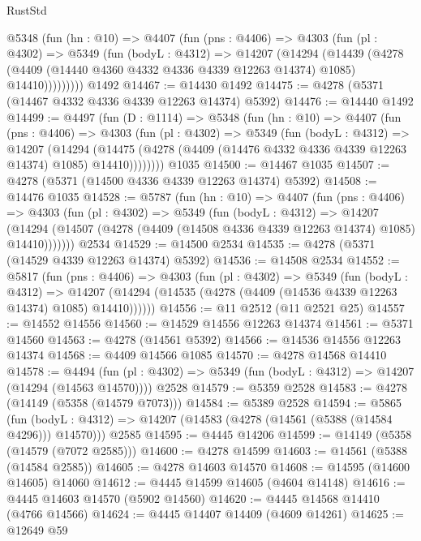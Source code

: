 \begin{lexlean}{RustStd}
\begin{coremodule}
{\begin{coremodule}
{{{{{{{{{{{{{{{{{{{{{{{{{{{{{{{{{{{      @5348
        (fun (hn : @10) =>
        @4407
          (fun (pns : @4406) =>
          @4303
            (fun (pl : @4302) =>
            @5349
              (fun (bodyL : @4312) =>
              @14207
                (@14294
                  (@14439
                    (@4278
                      (@4409 (@14440 @4360 @4332 @4336 @4339 @12263 @14374) @1085)
                      @14410)))))))))
    @1492
@14467 := @14430 @1492
@14475 := @4278 (@5371 (@14467 @4332 @4336 @4339 @12263 @14374) @5392)
@14476 := @14440 @1492
@14499 := @4497
    (fun (D : @1114) =>
    @5348
      (fun (hn : @10) =>
      @4407
        (fun (pns : @4406) =>
        @4303
          (fun (pl : @4302) =>
          @5349
            (fun (bodyL : @4312) =>
            @14207
              (@14294
                (@14475 (@4278 (@4409 (@14476 @4332 @4336 @4339 @12263 @14374) @1085) @14410))))))))
    @1035
@14500 := @14467 @1035
@14507 := @4278 (@5371 (@14500 @4336 @4339 @12263 @14374) @5392)
@14508 := @14476 @1035
@14528 := @5787
    (fun (hn : @10) =>
    @4407
      (fun (pns : @4406) =>
      @4303
        (fun (pl : @4302) =>
        @5349
          (fun (bodyL : @4312) =>
          @14207
            (@14294 (@14507 (@4278 (@4409 (@14508 @4336 @4339 @12263 @14374) @1085) @14410)))))))
    @2534
@14529 := @14500 @2534
@14535 := @4278 (@5371 (@14529 @4339 @12263 @14374) @5392)
@14536 := @14508 @2534
@14552 := @5817
    (fun (pns : @4406) =>
    @4303
      (fun (pl : @4302) =>
      @5349
        (fun (bodyL : @4312) =>
        @14207 (@14294 (@14535 (@4278 (@4409 (@14536 @4339 @12263 @14374) @1085) @14410))))))
@14556 := @11 @2512 (@11 @2521 @25)
@14557 := @14552 @14556
@14560 := @14529 @14556 @12263 @14374
@14561 := @5371 @14560
@14563 := @4278 (@14561 @5392)
@14566 := @14536 @14556 @12263 @14374
@14568 := @4409 @14566 @1085
@14570 := @4278 @14568 @14410
@14578 := @4494
    (fun (pl : @4302) => @5349 (fun (bodyL : @4312) => @14207 (@14294 (@14563 @14570))))
    @2528
@14579 := @5359 @2528
@14583 := @4278 (@14149 (@5358 (@14579 @7073)))
@14584 := @5389 @2528
@14594 := @5865
    (fun (bodyL : @4312) => @14207 (@14583 (@4278 (@14561 (@5388 (@14584 @4296))) @14570)))
    @2585
@14595 := @4445 @14206
@14599 := @14149 (@5358 (@14579 (@7072 @2585)))
@14600 := @4278 @14599
@14603 := @14561 (@5388 (@14584 @2585))
@14605 := @4278 @14603 @14570
@14608 := @14595 (@14600 @14605) @14060
@14612 := @4445 @14599 @14605 (@4604 @14148)
@14616 := @4445 @14603 @14570 (@5902 @14560)
@14620 := @4445 @14568 @14410 (@4766 @14566)
@14624 := @4445 @14407 @14409 (@4609 @14261)
@14625 := @12649 @59
}}}}}}}}}}}}}}}}}}}}}}}}}}}}}}}}}}}
\end{coremodule}}
\end{coremodule}
\end{lexlean}
